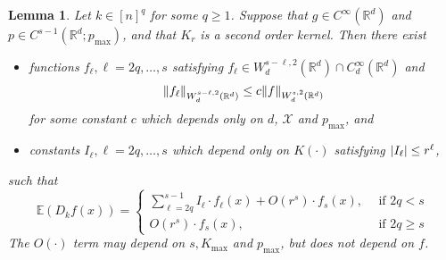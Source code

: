 \documentclass{article}
\newcommand{\Reals}{\mathbb{R}}
\newcommand{\1}{\mathbf{1}}
\newcommand{\Rd}{\Reals^d}
\newcommand{\Xset}{\mathcal{X}}
\newcommand{\Ebb}{\mathbb{E}}
\theoremstyle{alden}
\theoremstyle{aldenthm}
\newtheorem{lemma}{Lemma}
\theoremstyle{definition}
\theoremstyle{remark}
\begin{document}
\begin{lemma}
	\label{lem:leading_term_sobolev}
	Let $k \in [n]^q$ for some $q \geq 1$. Suppose that $g \in C^{\infty}(\Rd)$ and $p \in C^{s - 1}(\Rd;p_{\max})$, and that $K_r$ is a second order kernel. Then there exist
	\begin{itemize}
		\item functions $f_{\ell}, \ell = 2q,\ldots,s$ satisfying $f_{\ell} \in W_d^{s - \ell,2}(\Rd) \cap C_d^{\infty}(\Rd)$ and
		\begin{equation*}
		\norm{f_{\ell}}_{W_d^{s - \ell,2}(\Rd)} \leq c \norm{f}_{W_d^{s,2}(\Rd)}
		\end{equation*}
		for some constant $c$ which depends only on $d$, $\Xset$ and $p_{\max}$, and 
		\item constants $I_{\ell},\ell = 2q,\ldots,s$ which depend only on $K(\cdot)$ satisfying $\abs{I_{\ell}} \leq r^{\ell}$,
	\end{itemize}
	such that
	\begin{equation}
	\label{eqn:leading_term_sobolev}
	\Ebb(D_kf(x)) =
	\begin{cases*}
	\sum_{\ell = 2q}^{s - 1} I_{\ell} \cdot f_{\ell}(x) +  O(r^{s}) \cdot f_{s}(x),~~& \textrm{if $2q < s$} \\
	O(r^{s}) \cdot f_{s}(x),~~& \textrm{if $2q \geq s$}
	\end{cases*}
	\end{equation}
	The $O(\cdot)$ term may depend on $s, K_{\max}$ and $p_{\max}$, but does not depend on $f$.
\end{lemma}
\end{document}
